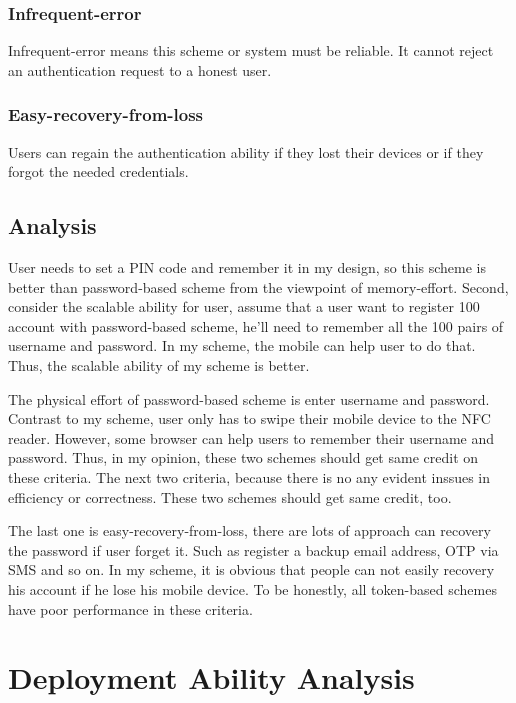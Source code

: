 \begin{CJK}{Bg5}{bsmi}
\subsubsection{Infrequent-error}

Infrequent-error means this scheme or system must be reliable. It cannot reject an authentication request to a honest user.

\subsubsection{Easy-recovery-from-loss}

Users can regain the authentication ability if they lost their devices or if they forgot the needed credentials.

\subsection{Analysis}

User needs to set a PIN code and remember it in my design, so this scheme is better than password-based scheme from the viewpoint of memory-effort. Second, consider the scalable ability for user, assume that a user want to register 100 account with password-based scheme, he'll need to remember all the 100 pairs of username and password. In my scheme, the mobile can help user to do that. Thus, the scalable ability of my scheme is better.

The physical effort of password-based scheme is enter username and password. Contrast to my scheme, user only has to swipe their mobile device to the NFC reader. However, some browser can help users to remember their username and password. Thus, in my opinion, these two schemes should get same credit on these criteria. The next two criteria, because there is no any evident inssues in efficiency or correctness. These two schemes should get same credit, too.

The last one is easy-recovery-from-loss, there are lots of approach can recovery the password if user forget it. Such as register a backup email address, OTP via SMS and so on. In my scheme, it is obvious that people can not easily recovery his account if he lose his mobile device. To be honestly, all token-based schemes have poor performance in these criteria.

\section{Deployment Ability Analysis}


\end{CJK}
